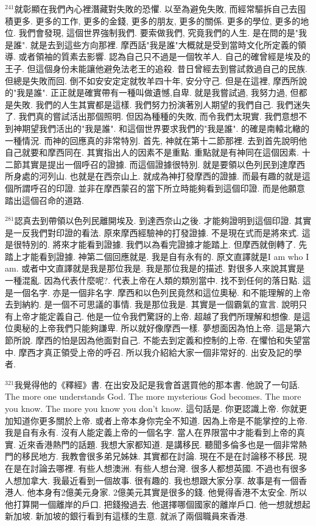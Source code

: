 \documentclass{book}
\begin{document}
$^{241}$就彰顯在我們內心裡潛藏對失敗的恐懼.
以至為避免失敗, 而經常驅拆自己去囤積更多.
更多的工作, 更多的金錢, 更多的朋友, 更多的關係.
更多的學位, 更多的地位.
我們會發現, 這個世界強制我們.
要索做我們, 究竟我們的人生.
是在問的是"我是誰".
就是去到這些方向那裡.
摩西話"我是誰"大概就是受到當時文化所定義的領導.
或者領袖的質素去影響.
認為自己只不過是一個牧羊人.
自己的確曾經是埃及的王子.
但這個身份未能讓他避免法老王的追殺.
昔日曾經去到嘗試救過自己的民族.
但總是失敗而回.
倒不如安安定定就牧羊四十年, 安分守己.
但是在這裡, 摩西所說的"我是誰".
正正就是確實帶有一種叫做遺憾,自卑.
就是我嘗試過, 我努力過, 但都是失敗.
我們的人生其實都是這樣.
我們努力扮演著別人期望的我們自己.
我們迷失了.
我們真的嘗試活出那個照明.
但因為種種的失敗, 而令我們太現實.
我們意想不到神期望我們活出的"我是誰".
和這個世界要求我們的"我是誰".
的確是南轅北轍的一種情況.
而神的回應真的非常特別.
首先, 神就在第十二節那裡.
去到首先說明他自己就要和摩西同在.
其實指出人的因素不是重點.
重點就是有神同在這個因素.
十二節其實是提出一個呼召的證據.
而這個證據很特別.
就是要領以色列民到達摩西所身處的河列山.
也就是在西奈山上.
就成為神打發摩西的證據.
而最有趣的就是這個所謂呼召的印證.
並非在摩西蒙召的當下所立時能夠看到這個印證.
而是他願意踏出這個召命的道路.

$^{281}$認真去到帶領以色列民離開埃及.
到達西奈山之後.
才能夠證明到這個印證.
其實是一反我們對印證的看法.
原來摩西經驗神的打發證據.
不是現在式而是將來式.
這是很特別的.
將來才能看到證據.
我們以為看完證據才能踏上.
但摩西就倒轉了.
先踏上才能看到證據.
神第二個回應就是.
我是自有永有的.
原文直譯就是I am who I am.
或者中文直譯就是我是那位我是.
我是那位我是的描述.
對很多人來說其實是一種混亂.
因為代表什麼呢?.
代表上帝在人類的類別當中.
找不到任何的落日點.
這是一個名字.
亦是一個非名字.
摩西和以色列民竟然和這位奧秘.
和不能理解的上帝去到納約.
是一個不可思議的事情.
我是那位我是.
其實是一個霸氣的宣言.
說明只有上帝才能定義自己.
他是一位令我們驚訝的上帝.
超越了我們所理解和想像.
是這位奧秘的上帝我們只能夠謙卑.
所以就好像摩西一樣.
夢想面因為怕上帝.
這是第六節所說.
摩西的怕是因為他面對自己.
不能去到定義和控制的上帝.
在懼怕和失望當中.
摩西才真正領受上帝的呼召.
所以我介紹給大家一個非常好的.
出安及記的學者.

$^{321}$我覺得他的《釋經》書.
在出安及記是我會首選買他的那本書.
他說了一句話.
The more one understands God.
The more mysterious God becomes.
The more you know.
The more you know you don't know.
這句話是.
你更認識上帝.
你就更加知道你更多關於上帝.
或者上帝本身你完全不知道.
因為上帝是不能掌控的上帝.
我是自有永有.
沒有人能定義上帝的一個名字.
當人在界限當中才能看到上帝的真實.
近來香港熱門的話題.
我想大家都知道.
是講移民.
聽聞多倫多也是一個非常熱門的移民地方.
我教會很多弟兄姊妹.
其實都在討論.
現在不是在討論移不移民.
現在是在討論去哪裡.
有些人想澳洲.
有些人想台灣.
很多人都想英國.
不過也有很多人想加拿大.
我最近看到一個故事.
很有趣的.
我也想跟大家分享.
故事是有一個香港人.
他本身有2億美元身家.
2億美元其實是很多的錢.
他覺得香港不太安全.
所以他打算開一個離岸的戶口.
把錢撥過去.
他選擇哪個國家的離岸戶口.
他一想就想起新加坡.
新加坡的銀行看到有這樣的生意.
就派了兩個職員來香港.
\end{document}
